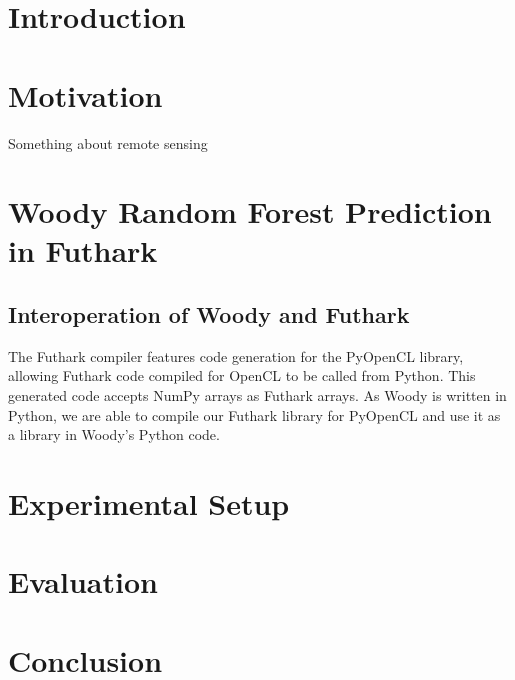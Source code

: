 \documentclass[a4paper]{article}
\begin{document}
\maketitle

\begin{abstract}

\end{abstract}

\section{Introduction}

\section{Motivation}

Something about remote sensing

\section{Woody Random Forest Prediction in Futhark}

\subsection{Interoperation of Woody and Futhark}

The Futhark compiler features code generation for the PyOpenCL library, allowing Futhark code compiled for OpenCL to be called from Python. This generated code accepts NumPy arrays as Futhark arrays. As Woody is written in Python, we are able to compile our Futhark library for PyOpenCL and use it as a library in Woody's Python code.

\section{Experimental Setup}

\section{Evaluation}

\section{Conclusion}
\end{document}
